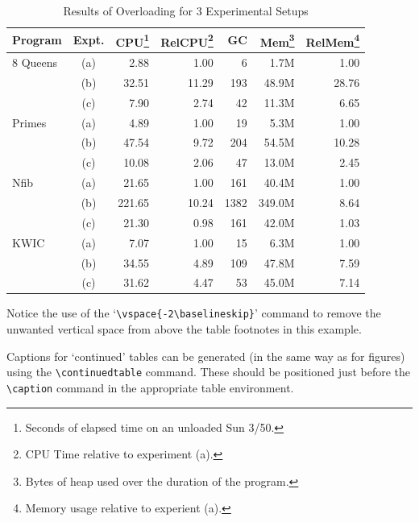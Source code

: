 \documentclass{article}
\begin{document}
%
\begin{table}
  \caption{Results of Overloading for 3 Experimental Setups}
  \label{sample-table}
  \begin{minipage}{\textwidth}
    \begin{tabular}{lcrrrrr}
      \hline\hline
      Program& Expt.&
      CPU\footnote{Seconds of elapsed time on an unloaded Sun 3/50.}&
      RelCPU\footnote{CPU Time relative to experiment (a).}& GC&
      Mem\footnote{Bytes of heap used over the duration of the program.}&
      RelMem\footnote{Memory usage relative to experient (a).}\\
      \hline
      8 Queens& (a)&   2.88&  1.00&    6&   1.7M&  1.00\\
      &         (b)&  32.51& 11.29&  193&  48.9M& 28.76\\
      &         (c)&   7.90&  2.74&   42&  11.3M&  6.65\\
      \noalign{\vspace {.5cm}}
      Primes&   (a)&   4.89&  1.00&   19&   5.3M&  1.00\\
      &         (b)&  47.54&  9.72&  204&  54.5M& 10.28\\
      &         (c)&  10.08&  2.06&   47&  13.0M&  2.45\\
      \noalign{\vspace {.5cm}}
      Nfib&     (a)&  21.65&  1.00&  161&  40.4M&  1.00\\
      &         (b)& 221.65& 10.24& 1382& 349.0M&  8.64\\
      &         (c)&  21.30&  0.98&  161&  42.0M&  1.03\\
      \noalign{\vspace {.5cm}}
      KWIC&     (a)&   7.07&  1.00&   15&   6.3M&  1.00\\
      &         (b)&  34.55&  4.89&  109&  47.8M&  7.59\\
      &         (c)&  31.62&  4.47&   53&  45.0M&  7.14\\
      \hline\hline
    \end{tabular}
    \vspace{-2\baselineskip}
  \end{minipage}
\end{table}

Notice the use of the `\verb"\vspace{-2\baselineskip}"' command to remove the
unwanted vertical space from above the table footnotes in this example.

Captions for `continued' tables can be generated (in the same way as for figures)
using the \verb"\continuedtable" command. These should be positioned just before
the \verb"\caption" command in the appropriate table environment.
\end{document}
